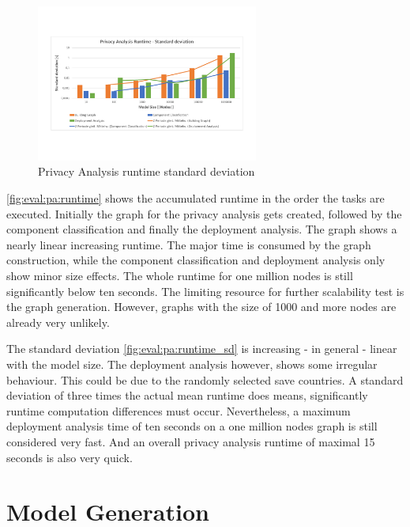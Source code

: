 \begin{figure}
	\begin{center}
		\includegraphics[trim = 5mm 30mm 10mm 30mm, clip, width=0.65\textwidth]{graphs/Runtime_pa_sd}
	\end{center}
	\caption{Privacy Analysis runtime standard deviation}
	\label{fig:eval:pa:runtime_sd}
\end{figure}

\autoref{fig:eval:pa:runtime} shows the accumulated runtime in the order the tasks are executed. Initially the graph for the privacy analysis gets created, followed by the component classification and finally the deployment analysis. The graph shows a nearly linear increasing runtime. The major time is consumed by the graph construction, while the component classification and deployment analysis only show minor size effects. The whole runtime for one million nodes is still significantly below ten seconds. The limiting resource for further scalability test is the graph generation. However, graphs with the size of 1000 and more nodes are already very unlikely.

The standard deviation \autoref{fig:eval:pa:runtime_sd} is increasing - in general - linear with the model size. The deployment analysis however, shows some irregular behaviour. This could be due to the randomly selected save countries. A standard deviation of three times the actual mean runtime does means, significantly runtime computation differences must occur. Nevertheless, a maximum deployment analysis time of ten seconds on a one million nodes graph is still considered very fast. And an overall privacy analysis runtime of maximal 15 seconds is also very quick.


\section{Model Generation}
\label{sec:Evaluation:generation}

